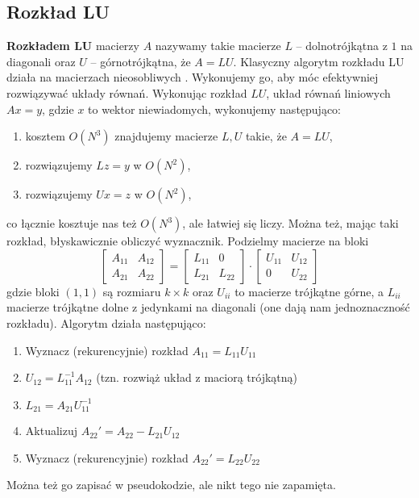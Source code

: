 \subsection{Rozkład LU}
\textbf{Rozkładem LU} macierzy $A$ nazywamy takie macierze $L$ -- dolnotrójkątna z $1$ na diagonali oraz $U$ -- górnotrójkątna, że $A=LU$. Klasyczny algorytm rozkładu LU działa na macierzach nieosobliwych . Wykonujemy go, aby móc efektywniej rozwiązywać układy równań. Wykonując rozkład $LU$, układ równań liniowych $Ax=y$, gdzie $x$ to wektor niewiadomych, wykonujemy następująco:
\begin{enumerate}
    \item kosztem $O(N^3)$ znajdujemy macierze $L,U$ takie, że $A=LU$,
    \item rozwiązujemy $Lz=y$ w $O(N^2)$,
    \item rozwiązujemy $Ux=z$ w $O(N^2)$,
\end{enumerate}
co łącznie kosztuje nas też $O(N^3)$, ale łatwiej się liczy. Można też, mając taki rozkład, błyskawicznie obliczyć wyznacznik. Podzielmy macierze na bloki
$$
\begin{bmatrix}
    A_{11} & A_{12} \\ A_{21} & A_{22}
\end{bmatrix} = \begin{bmatrix}
    L_{11} & 0 \\ L_{21} & L_{22}
\end{bmatrix} \cdot \begin{bmatrix}
    U_{11} & U_{12} \\ 0 & U_{22}
\end{bmatrix}
$$
gdzie bloki $(1,1)$ są rozmiaru $k\times k$ oraz $U_{ii}$ to macierze trójkątne górne, a $L_{ii}$ macierze trójkątne dolne z jedynkami na diagonali (one dają nam jednoznaczność rozkładu). Algorytm działa następująco:
\begin{enumerate}
    \item Wyznacz (rekurencyjnie) rozkład $A_{11}=L_{11}U_{11}$
    \item $U_{12}=L_{11}^{-1}A_{12}$ (tzn. rozwiąż układ z maciorą trójkątną)
    \item $L_{21}=A_{21}U_{11}^{-1}$
    \item Aktualizuj $A_{22}'=A_{22}-L_{21}U_{12}$
    \item Wyznacz (rekurencyjnie) rozkład $A_{22}'=L_{22}U_{22}$
\end{enumerate}
Można też go zapisać w pseudokodzie, ale nikt tego nie zapamięta. 

